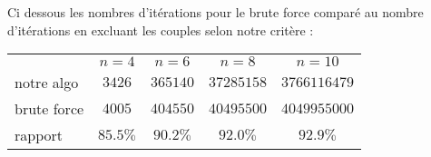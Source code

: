 \documentclass[10pt,a4paper,final]{article}
\begin{document}
Ci dessous les nombres d'itérations pour le brute force comparé au nombre d'itérations en excluant les couples selon notre critère :
\newline

\begin{tabular}{lcccc}

  \hline
    & $n = 4$ & $n=6$ & $n=8$ & $n=10$ \\
  notre algo & $3426$ & $365140$ & $37285158$ & $3766116479$ \\
  brute force & $4005$ & $404550$ & $40495500$ & $4049955000$ \\
  rapport & $85.5\%$ & $90.2\%$ & $92.0\%$ & $92.9\%$\\
  \hline
  \end{tabular}



  
\end{document}
